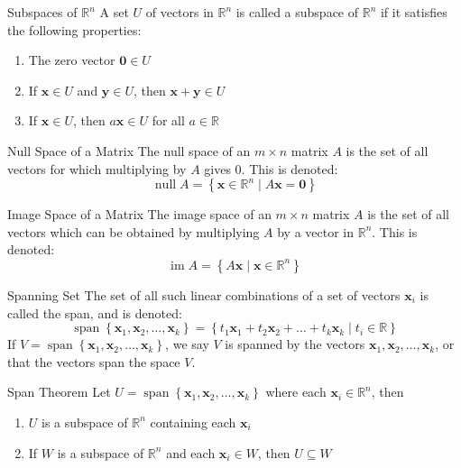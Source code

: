 \documentclass[12pt]{article}
\begin{document}
\begin{definition}{Subspaces of $ \mathbb{R}^n $}{}
    A set $ U $ of vectors in $ \mathbb{R}^n $ is called a subspace of $ \mathbb{R}^n $ if it satisfies the following properties:
    \begin{enumerate}
        \item The zero vector $ \mathbf{0} \in U $
        \item If $ \mathbf{x} \in U $ and $ \mathbf{y} \in U $, then $ \mathbf{x} + \mathbf{y} \in U $
        \item If $ \mathbf{x} \in U $, then $ a \mathbf{x} \in U $ for all $ a \in \mathbb{R} $
    \end{enumerate}
\end{definition}

\begin{definition}{Null Space of a Matrix}{}
    The null space of an $ m \times n $ matrix $ A $ is the set of all vectors for which multiplying by $ A $ gives 0. This is denoted:
    \[ \operatorname{null} A = \left\{ \mathbf{x} \in \mathbb{R}^n \mid A \mathbf{x} = \mathbf{0} \right\} \]
\end{definition}

\begin{definition}{Image Space of a Matrix}{}
    The image space of an $ m \times n $ matrix $ A $ is the set of all vectors which can be obtained by multiplying $ A $ by a vector in $ \mathbb{R}^n $. This is denoted:
    \[ \operatorname{im} A = \left\{ A \mathbf{x} \mid \mathbf{x} \in \mathbb{R}^n \right\} \]
\end{definition}

\begin{definition}{Spanning Set}{}
    The set of all such linear combinations of a set of vectors $ \mathbf{x}_i $ is called the span, and is denoted:
    \[ \operatorname{span} \left\{ \mathbf{x}_1, \mathbf{x}_2, \dots, \mathbf{x}_k \right\} = \left\{ t_1 \mathbf{x}_1 + t_2 \mathbf{x}_2 + \dots + t_k \mathbf{x}_k \mid t_i \in \mathbb{R} \right\} \]
    If $ V = \operatorname{span} \left\{ \mathbf{x}_1, \mathbf{x}_2, \dots, \mathbf{x}_k \right\} $, we say $ V $ is spanned by the vectors $ \mathbf{x}_1, \mathbf{x}_2, \dots, \mathbf{x}_k $, or that the vectors span the space $ V $.
\end{definition}

\begin{theorem}{Span Theorem}{}
    Let $ U = \operatorname{span} \left\{ \mathbf{x}_1, \mathbf{x}_2, \dots, \mathbf{x}_k \right\} $ where each $ \mathbf{x}_i \in \mathbb{R}^n $, then
    \begin{enumerate}
        \item $ U $ is a subspace of $ \mathbb{R}^n $ containing each $ \mathbf{x}_i $
        \item If $ W $ is a subspace of $ \mathbb{R}^n $ and each $ \mathbf{x}_i \in W $, then $ U \subseteq W $
    \end{enumerate}
\end{theorem}
\end{document}
